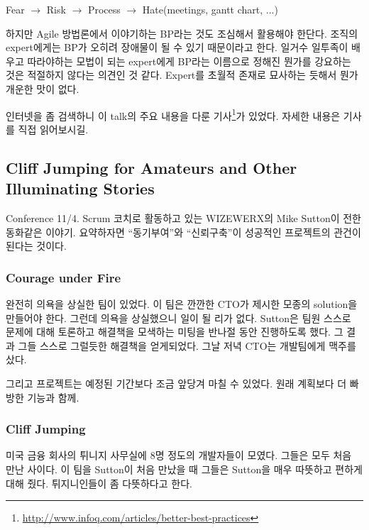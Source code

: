 \documentclass[11pt]{article}
\begin{document}
\begin{center}
Fear $\rightarrow$ Risk $\rightarrow$ Process $\rightarrow$ Hate(meetings, gantt chart, ...)
\end{center}

하지만 Agile 방법론에서 이야기하는 BP라는 것도 조심해서 활용해야 한단다. 
조직의 expert에게는 BP가 오히려 장애물이 될 수 있기 때문이라고 한다.
일거수 일투족이 배우고 따라야하는 모법이 되는 expert에게
BP라는 이름으로 정해진 뭔가를 강요하는 것은 적절하지 않다는 의견인 것 같다.
Expert를 초월적 존재로 묘사하는 듯해서 뭔가 개운한 맛이 없다. 


인터넷을 좀 검색하니 이 talk의 주요 내용을 다룬 
기사\footnote{\url{http://www.infoq.com/articles/better-best-practices}}가 
있었다. 자세한 내용은 기사를 직접 읽어보시길.

\subsection{Cliff Jumping for Amateurs and Other
  Illuminating Stories}

Conference 11/4. Scrum 코치로 활동하고 있는 WIZEWERX의 Mike Sutton이 전한 
동화같은 이야기. 요약하자면 ``동기부여''와 ``신뢰구축''이 성공적인 프로젝트의 
관건이 된다는 것이다.
 
\subsubsection{Courage under Fire}
 
완전히 의욕을 상실한 팀이 있었다. 이 팀은 깐깐한 CTO가 제시한 모종의 solution을
만들어야 한다. 그런데 의욕을 상실했으니 일이 될 리가 없다. Sutton은
팀원 스스로 문제에 대해 토론하고 해결책을 모색하는 미팅을 반나절 동안
진행하도록 했다. 그 결과 그들 스스로 그럴듯한 해결책을 얻게되었다. 그날
저녁 CTO는 개발팀에게 맥주를 샀다.
 
그리고 프로젝트는 예정된 기간보다 조금 앞당겨 마칠 수 
있었다. 원래 계획보다 더 빠방한 기능과 함께.

\subsubsection{Cliff Jumping}
 
미국 금융 회사의 튀니지 사무실에 8명 정도의 개발자들이 모였다. 그들은
모두 처음 만난 사이다.  이 팀을 Sutton이 처음 만났을 때 그들은 Sutton을
매우 따뜻하고 편하게 대해 줬다. 튀지니인들이 좀 다뜻하다고 한다.
 
\end{document}
